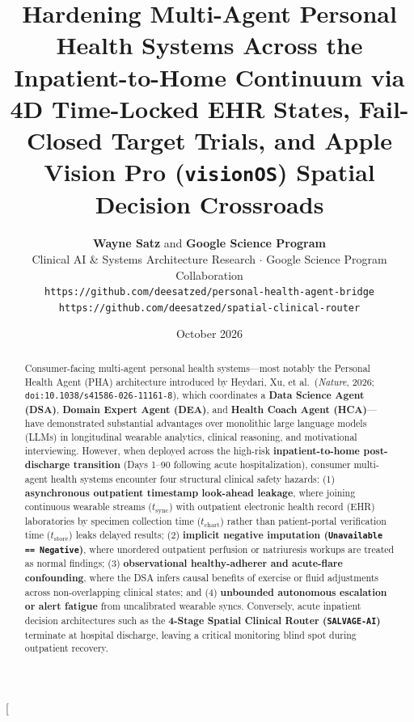 \documentclass[10pt,twocolumn,letterpaper]{article}
\title{\textbf{Hardening Multi-Agent Personal Health Systems Across the Inpatient-to-Home Continuum via 4D Time-Locked EHR States, Fail-Closed Target Trials, and Apple Vision Pro (\texttt{visionOS}) Spatial Decision Crossroads}}
\author{
  \textbf{Wayne Satz} \quad and \quad \textbf{Google Science Program} \\
  \small Clinical AI \& Systems Architecture Research $\cdot$ Google Science Program Collaboration \\
  \texttt{https://github.com/deesatzed/personal-health-agent-bridge} \\
  \texttt{https://github.com/deesatzed/spatial-clinical-router}
}
\date{October 2026}
\begin{document}
\twocolumn[{
\begin{@twocolumnfalse}
\maketitle
\begin{abstract}
\noindent Consumer-facing multi-agent personal health systems---most notably the Personal Health Agent (PHA) architecture introduced by Heydari, Xu, et al.\ (\textit{Nature}, 2026; \texttt{doi:10.1038/s41586-026-11161-8}), which coordinates a \textbf{Data Science Agent (DSA)}, \textbf{Domain Expert Agent (DEA)}, and \textbf{Health Coach Agent (HCA)}---have demonstrated substantial advantages over monolithic large language models (LLMs) in longitudinal wearable analytics, clinical reasoning, and motivational interviewing. However, when deployed across the high-risk \textbf{inpatient-to-home post-discharge transition} (Days 1--90 following acute hospitalization), consumer multi-agent health systems encounter four structural clinical safety hazards: (1) \textbf{asynchronous outpatient timestamp look-ahead leakage}, where joining continuous wearable streams ($t_{\text{sync}}$) with outpatient electronic health record (EHR) laboratories by specimen collection time ($t_{\text{chart}}$) rather than patient-portal verification time ($t_{\text{store}}$) leaks delayed results; (2) \textbf{implicit negative imputation (\texttt{Unavailable == Negative})}, where unordered outpatient perfusion or natriuresis workups are treated as normal findings; (3) \textbf{observational healthy-adherer and acute-flare confounding}, where the DSA infers causal benefits of exercise or fluid adjustments across non-overlapping clinical states; and (4) \textbf{unbounded autonomous escalation or alert fatigue} from uncalibrated wearable syncs. Conversely, acute inpatient decision architectures such as the \textbf{4-Stage Spatial Clinical Router (\texttt{SALVAGE-AI})} terminate at hospital discharge, leaving a critical monitoring blind spot during outpatient recovery.


\end{abstract}
\end{@twocolumnfalse}}
\end{document}
